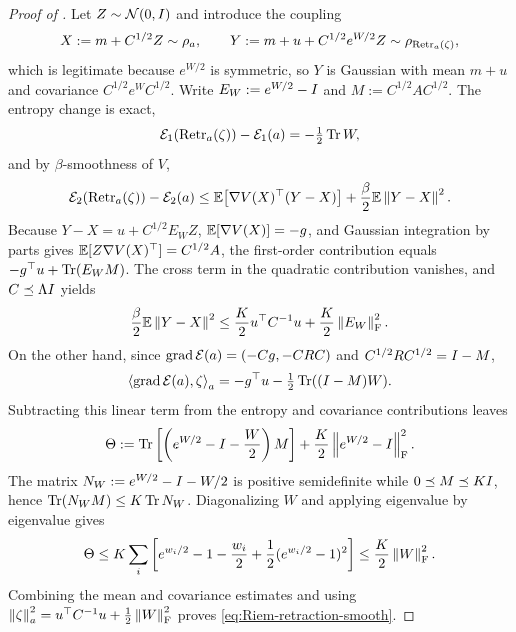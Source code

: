 \begin{proof}[Proof of ]
    Let $Z\sim\mathcal{N}(0,I)$ and introduce the coupling
    \begin{equation*}
        X:=m+C^{1/2}Z\sim\rho_a,
        \qquad
        Y:=m+u+C^{1/2}e^{W/2}Z\sim\rho_{\operatorname{Retr}_a(\zeta)},
    \end{equation*}
    which is legitimate because $e^{W/2}$ is symmetric, so $Y$ is Gaussian with mean $m+u$ and
    covariance $C^{1/2}e^WC^{1/2}$. Write $E_W:=e^{W/2}-I$ and $M:=C^{1/2}AC^{1/2}$. The
    entropy change is exact,
    \begin{equation*}
        \mathcal{E}_1(\operatorname{Retr}_a(\zeta))-\mathcal{E}_1(a)=-\tfrac12\operatorname{Tr} W,
    \end{equation*}
    and by $\beta$-smoothness of $V$,
    \begin{equation*}
        \mathcal{E}_2(\operatorname{Retr}_a(\zeta))-\mathcal{E}_2(a)
        \leq
        \mathbb{E}\bigl[\nabla V(X)^\top(Y-X)\bigr]+\frac\beta2\mathbb{E}\left\lVert Y-X\right\rVert^2 .
    \end{equation*}
    Because $Y-X=u+C^{1/2}E_WZ$, $\mathbb{E}[\nabla V(X)]=-g$, and Gaussian integration by parts gives
    $\mathbb{E}[Z\nabla V(X)^\top]=C^{1/2}A$, the first-order contribution equals
    $-g^\top u+\operatorname{Tr}(E_WM)$. The cross term in the quadratic contribution vanishes, and
    $C\preceq\Lambda I$ yields
    \begin{equation*}
        \frac\beta2\mathbb{E}\left\lVert Y-X\right\rVert^2
        \leq
        \frac K2u^\top C^{-1}u+\frac K2\left\lVert E_W\right\rVert_{\mathrm{F}}^2 .
    \end{equation*}
    On the other hand, since $\operatorname{grad}\mathcal{E}(a)=(-Cg,-CRC)$ and $C^{1/2}RC^{1/2}=I-M$,
    \begin{equation*}
        \left\langle \operatorname{grad}\mathcal{E}(a),\zeta\right\rangle_a=-g^\top u-\tfrac12\operatorname{Tr}((I-M)W).
    \end{equation*}
    Subtracting this linear term from the entropy and covariance contributions leaves
    \begin{equation*}
        \Theta
        :=\operatorname{Tr}\left[\left(e^{W/2}-I-\frac W2\right)M\right]
          +\frac K2\left\lVert e^{W/2}-I\right\rVert_{\mathrm{F}}^2 .
    \end{equation*}
    The matrix $N_W:=e^{W/2}-I-W/2$ is positive semidefinite while $0\preceq M\preceq KI$,
    hence $\operatorname{Tr}(N_WM)\leq K\operatorname{Tr} N_W$. Diagonalizing $W$ and applying
     eigenvalue by eigenvalue gives
    \begin{equation*}
        \Theta
        \leq K\sum_i\left[e^{w_i/2}-1-\frac{w_i}2+\frac12(e^{w_i/2}-1)^2\right]
        \leq\frac K2\left\lVert W\right\rVert_{\mathrm{F}}^2 .
    \end{equation*}
    Combining the mean and covariance estimates and using
    $\left\lVert \zeta\right\rVert_a^2=u^\top C^{-1}u+\tfrac12\left\lVert W\right\rVert_{\mathrm{F}}^2$ proves
    \eqref{eq:Riem-retraction-smooth}.


\end{proof}
